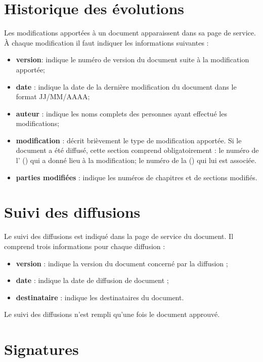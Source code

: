 \section{Historique des évolutions}

Les modifications apportées à un document apparaissent dans sa page de service. À chaque modification il faut indiquer les informations suivantes :
\begin{itemize}
 \item \textbf{version}: indique le numéro de version du document suite à la modification apportée;
\item \textbf{date} : indique la date de la dernière modification du document dans le format JJ/MM/AAAA;
\item \textbf{auteur} : indique les noms complets des personnes ayant effectué les modifications;
\item \textbf{modification} : décrit brièvement le type de modification apportée. Si le document a
été diffusé, cette section comprend obligatoirement :
	\subitem \textbullet{ }le numéro de l'\OC{} (\OCCourt{}) qui a donné lieu à la modification;
	\subitem \textbullet{ }le numéro de la \FFT{} (\FFTCourt{}) qui lui est associée.
\item \textbf{parties modifiées} : indique les numéros de chapitres et de sections modifiés.
\end{itemize}

\section{Suivi des diffusions}

Le suivi des diffusions est indiqué dans la page de service du document. Il comprend trois informations pour chaque diffusion :
\begin{itemize}
\item \textbf{version} : indique la version du document concerné par la diffusion ;
\item  \textbf{date} : indique la date de diffusion de document ;
\item \textbf{destinataire} : indique les destinataires du document. 
\end{itemize}
 Le suivi des diffusions n’est rempli qu’une fois le document approuvé.

\section{Signatures}

